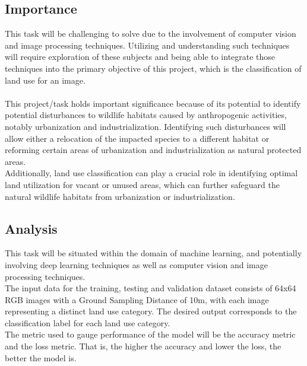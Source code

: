 \documentclass[acmtog]{acmart}
\begin{document}
	\subsection{Importance}
	This task will be challenging to solve due to the involvement of computer vision and image processing techniques. Utilizing and understanding such techniques will require exploration of these subjects and being able to integrate those techniques into the primary objective of this project, which is the classification of land use for an image.\\
	\\
	This project/task holds important significance because of its potential to identify potential disturbances to wildlife habitats caused by anthropogenic activities, notably urbanization and industrialization. Identifying such disturbances will allow either a relocation of the impacted species to a different habitat or reforming certain areas of urbanization and industrialization as natural protected areas.\\
	Additionally, land use classification can play a crucial role in identifying optimal land utilization for vacant or unused areas, which can further safeguard the natural wildlife habitats from urbanization or industrialization.
	
	\subsection{Analysis}
	This task will be situated within the domain of machine learning, and potentially involving deep learning techniques as well as computer vision and image processing techniques.\\
	The input data for the training, testing and validation dataset consists of 64x64 RGB images with a Ground Sampling Distance of 10m, with each image representing a distinct land use category. The desired output corresponds to the classification label for each land use category.\\
	The metric used to gauge performance of the model will be the accuracy metric and the loss metric. That is, the higher the accuracy and lower the loss, the better the model is.
\end{document}
